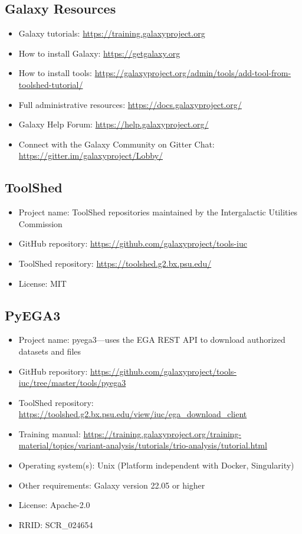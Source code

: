\subsection*{Galaxy Resources}
\begin{itemize}
    \item Galaxy tutorials: \url{https://training.galaxyproject.org}
    \item How to install Galaxy: \url{https://getgalaxy.org}
    \item How to install tools: \url{https://galaxyproject.org/admin/tools/add-tool-from-toolshed-tutorial/}
    \item Full administrative resources: \url{https://docs.galaxyproject.org/}
    \item Galaxy Help Forum: \url{https://help.galaxyproject.org/}
    \item Connect with the Galaxy Community on Gitter Chat: \url{https://gitter.im/galaxyproject/Lobby/}
\end{itemize}

\subsection*{ToolShed}
\begin{itemize}
    \item Project name: ToolShed repositories maintained by the Intergalactic Utilities Commission
    \item GitHub repository: \url{https://github.com/galaxyproject/tools-iuc} 
    \item ToolShed repository: \url{https://toolshed.g2.bx.psu.edu/}
    \item License: MIT
\end{itemize}

\subsection*{PyEGA3}
\begin{itemize}
    \item Project name: pyega3—uses the EGA REST API to download authorized datasets and files
    \item GitHub repository: \url{https://github.com/galaxyproject/tools-iuc/tree/master/tools/pyega3}
    \item ToolShed repository: \url{https://toolshed.g2.bx.psu.edu/view/iuc/ega_download_client}
    \item Training manual: \url{https://training.galaxyproject.org/training-material/topics/variant-analysis/tutorials/trio-analysis/tutorial.html}
    \item Operating system(s): Unix (Platform independent with Docker, Singularity)
    \item Other requirements: Galaxy version 22.05 or higher
    \item License: Apache-2.0
    \item RRID: SCR\_024654
\end{itemize}

